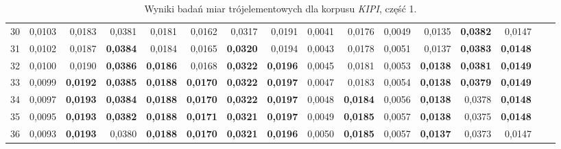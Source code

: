 \begin{table}[htp!]
\begin{adjustwidth}{-1cm}{}
\begin{tabular}{ l | *{15}{| r}}
30	&	0,0103	&	0,0183	&	0,0381	&	0,0181	&	0,0162	&	0,0317	&	0,0191	&	0,0041	&	0,0176	&	0,0049	&	0,0135	&	\textbf{0,0382}	&	0,0147	\\
31	&	0,0102	&	0,0187	&	\textbf{0,0384}	&	0,0184	&	0,0165	&	\textbf{0,0320}	&	0,0194	&	0,0043	&	0,0178	&	0,0051	&	0,0137	&	\textbf{0,0383}	&	\textbf{0,0148}	\\
32	&	0,0100	&	0,0190	&	\textbf{0,0386}	&	\textbf{0,0186}	&	0,0168	&	\textbf{0,0322}	&	\textbf{0,0196}	&	0,0045	&	0,0181	&	0,0053	&	\textbf{0,0138}	&	\textbf{0,0381}	&	\textbf{0,0149}	\\
33	&	0,0099	&	\textbf{0,0192}	&	\textbf{0,0385}	&	\textbf{0,0188}	&	\textbf{0,0170}	&	\textbf{0,0322}	&	\textbf{0,0197}	&	0,0047	&	0,0183	&	0,0054	&	\textbf{0,0138}	&	\textbf{0,0379}	&	\textbf{0,0149}	\\
34	&	0,0097	&	\textbf{0,0193}	&	\textbf{0,0384}	&	\textbf{0,0188}	&	\textbf{0,0170}	&	\textbf{0,0322}	&	\textbf{0,0197}	&	0,0048	&	\textbf{0,0184}	&	0,0056	&	\textbf{0,0138}	&	0,0378	&	\textbf{0,0148}	\\
35	&	0,0095	&	\textbf{0,0193}	&	\textbf{0,0382}	&	\textbf{0,0188}	&	\textbf{0,0171}	&	\textbf{0,0321}	&	\textbf{0,0197}	&	0,0049	&	\textbf{0,0185}	&	0,0057	&	\textbf{0,0138}	&	0,0375	&	\textbf{0,0148}	\\
36	&	0,0093	&	\textbf{0,0193}	&	0,0380	&	\textbf{0,0188}	&	\textbf{0,0170}	&	\textbf{0,0321}	&	\textbf{0,0196}	&	0,0050	&	\textbf{0,0185}	&	0,0057	&	\textbf{0,0137}	&	0,0373	&	0,0147	\\
	\bottomrule
\end{tabular}
 \end{adjustwidth}
\caption[Wyniki badań miar trójelementowych dla korpusu \emph{KIPI}, część 1]{Wyniki badań miar trójelementowych dla korpusu \emph{KIPI}, część 1.}
\label{KIPI_3_part_1}
\end{table}

